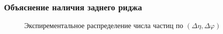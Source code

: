 \documentclass{beamer}
\renewcommand{\l}{\left( }
\renewcommand{\r}{\right) }
\renewcommand{\phi}{\varphi}
\newcommand{\br}[1]{\l {#1} \r}
\begin{document}
\begin{frame}[fragile]
\frametitle{Объяснение наличия заднего риджа}
\begin{minipage}[h]{0.48\linewidth}
\begin{figure}
\caption{Экспирементальное распределение числа частиц по $\br{\Delta \eta, \Delta \phi}$  }
\end{figure}
\end{minipage}
\begin{minipage}[h]{0.48\linewidth}
\begin{figure}
\end{figure}
\begin{figure}

\end{figure}
\end{minipage}
\end{frame}
\end{document}
